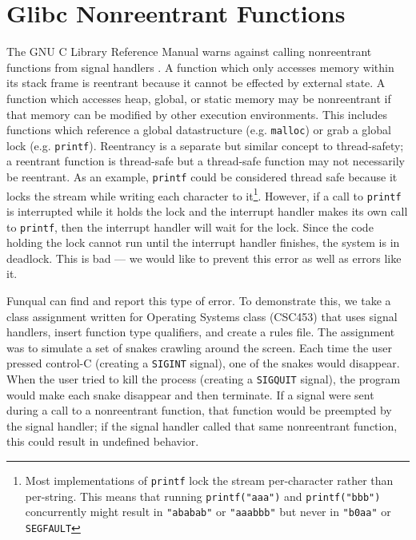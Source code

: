 \section{Glibc Nonreentrant Functions}\label{sec:app:reentrancy}


The GNU C Library Reference Manual warns against calling nonreentrant functions from signal handlers \cite{gnu-manual}.  A function which only accesses memory within its stack frame is reentrant because it cannot be effected by external state.  A function which accesses heap, global, or static memory may be nonreentrant if that memory can be modified by other execution environments.  This includes functions which reference a global datastructure (e.g. \lstinline{malloc}) or grab a global lock (e.g. \lstinline{printf}).  Reentrancy is a separate but similar concept to thread-safety; a reentrant function is thread-safe but a thread-safe function may not necessarily be reentrant.  As an example, \lstinline{printf} could be considered thread safe because it locks the stream while writing each character to it\footnote{Most implementations of \lstinline{printf} lock the stream per-character rather than per-string.  This means that running \mbox{\lstinline{printf("aaa")}} and \mbox{\lstinline{printf("bbb")}} concurrently might result in \mbox{\lstinline{"ababab"}} or \mbox{\lstinline{"aaabbb"}} but never in \mbox{\lstinline{"b0aa"}} or \mbox{\lstinline{SEGFAULT}}}.  However, if a call to \lstinline{printf} is interrupted while it holds the lock and the interrupt handler makes its own call to \lstinline{printf}, then the interrupt handler will wait for the lock.  Since the code holding the lock cannot run until the interrupt handler finishes, the system is in deadlock.  This is bad --- we would like to prevent this error as well as errors like it.  

Funqual can find and report this type of error.  To demonstrate this, we take a class assignment written for Operating Systems class (CSC453) that uses signal handlers, insert function type qualifiers, and create a rules file.  The assignment was to simulate a set of snakes crawling around the screen.  Each time the user pressed control-C (creating a \lstinline{SIGINT} signal), one of the snakes would disappear.  When the user tried to kill the process (creating a \lstinline{SIGQUIT} signal), the program would make each snake disappear and then terminate.  If a signal were sent during a call to a nonreentrant function, that function would be preempted by the signal handler; if the signal handler called that same nonreentrant function, this could result in undefined behavior.  

